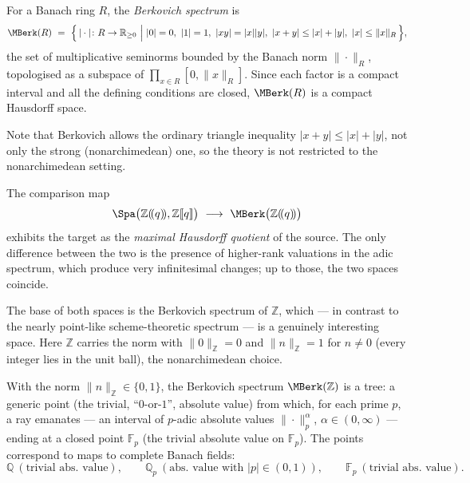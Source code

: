 \begin{definition}
\label{def:12:berkovich}
For a Banach ring $R$, the \emph{Berkovich spectrum} is
\begin{equation*}
\MBerk(R)\ =\ \Bigl\{\,|\cdot|\colon R\to\mathbb{R}_{\ge0}\ \Big|\
|0|=0,\ |1|=1,\ |xy|=|x||y|,\ |x+y|\le|x|+|y|,\ |x|\le\|x\|_R\,\Bigr\},
\end{equation*}
the set of multiplicative seminorms bounded by the Banach norm $\|\cdot\|_R$,
topologised as a subspace of $\prod_{x\in R}[0,\|x\|_R]$. Since each factor is a
compact interval and all the defining conditions are closed, $\MBerk(R)$ is a
compact Hausdorff space.
\end{definition}

Note that Berkovich allows the ordinary triangle inequality $|x+y|\le|x|+|y|$,
not only the strong (nonarchimedean) one, so the theory is not restricted to the
nonarchimedean setting.

\begin{proposition}
\label{prop:12:spa-berk}
The comparison map
\begin{equation*}
\Spa\bigl(\mathbb{Z}(\!(q)\!),\mathbb{Z}[\![q]\!]\bigr)\ \longrightarrow\
\MBerk\bigl(\mathbb{Z}(\!(q)\!)\bigr)
\end{equation*}
exhibits the target as the \emph{maximal Hausdorff quotient} of the source. The
only difference between the two is the presence of higher-rank valuations in the
adic spectrum, which produce very infinitesimal changes; up to those, the two
spaces coincide.
\end{proposition}

The base of both spaces is the Berkovich spectrum of $\mathbb{Z}$, which --- in
contrast to the nearly point-like scheme-theoretic spectrum --- is a genuinely
interesting space. Here $\mathbb{Z}$ carries the norm with $\|0\|_{\mathbb{Z}}=0$
and $\|n\|_{\mathbb{Z}}=1$ for $n\ne0$ (every integer lies in the unit ball), the
nonarchimedean choice.

\begin{proposition}
\label{prop:12:berkovich-Z}
With the norm $\|n\|_{\mathbb{Z}}\in\{0,1\}$, the Berkovich spectrum
$\MBerk(\mathbb{Z})$ is a tree: a generic point (the trivial, ``$0$-or-$1$'',
absolute value) from which, for each prime $p$, a ray emanates --- an interval
of $p$-adic absolute values $\|\cdot\|_p^{\alpha}$, $\alpha\in(0,\infty)$ ---
ending at a closed point $\mathbb{F}_p$ (the trivial absolute value on
$\mathbb{F}_p$). The points correspond to maps to complete Banach fields:
\begin{equation*}
\mathbb{Q}\ (\text{trivial abs. value}),\qquad
\mathbb{Q}_p\ (\text{abs. value with } |p|\in(0,1)),\qquad
\mathbb{F}_p\ (\text{trivial abs. value}).
\end{equation*}
\end{proposition}

